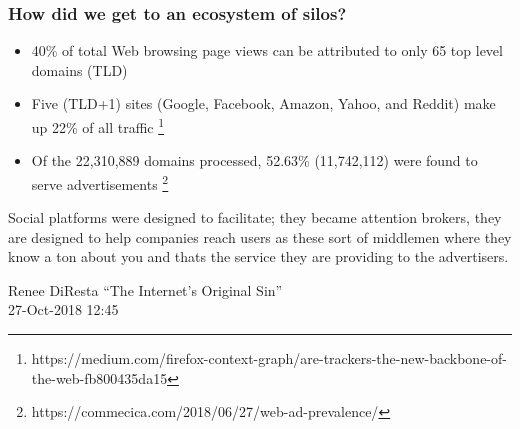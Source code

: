 \documentclass[aspectratio=169]{beamer}
\begin{document}
{
%
\begin{frame}
\frametitle{How did we get to an ecosystem of silos?}
%
\begin{itemize}
\item{40\% of total Web browsing page views can be attributed to only 65 top level domains (TLD)}
\item{Five (TLD+1) sites (Google, Facebook, Amazon, Yahoo, and Reddit) make up 22\% of all traffic
\footnote{https://medium.com/firefox-context-graph/are-trackers-the-new-backbone-of-the-web-fb800435da15}}
\item{Of the 22,310,889 domains processed, 52.63\% (11,742,112) were found to serve advertisements
\footnote{https://commecica.com/2018/06/27/web-ad-prevalence/}}
\end{itemize}
%
\end{frame}
}

\begin{frame}
%
\epigraph{Social platforms were designed to facilitate; they became attention brokers, they are designed to help companies reach users as these sort of middlemen where they know a ton about you and thats the service they are providing to the advertisers.}{Renee DiResta ``The Internet's Original Sin'' \\ 27-Oct-2018 12:45}
%
\end{frame}
\end{document}
